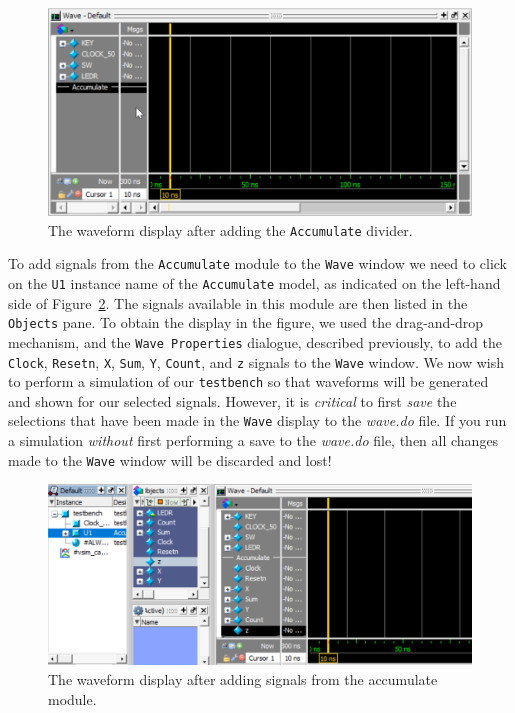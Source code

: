 \documentclass[11pt, twoside, pdftex]{article}
\begin{document}
\newpage
\begin{figure}[h]
	\begin{center}
		\includegraphics[width = \textwidth]{figures/appa_fig7.png}
	\end{center}
	\caption{The waveform display after adding the \texttt{Accumulate} divider.}
	\label{fig:appa_fig7}
\end{figure}

\noindent
To add signals from the \texttt{Accumulate} module to the \texttt{Wave} window we need to
click on the \texttt{U1} instance name of the \texttt{Accumulate} model, as indicated  
on the left-hand side of Figure~\ref{fig:appa_fig8}. The signals available in this module
are then listed in the \texttt{Objects} pane. To obtain the display in the figure, we
used the drag-and-drop mechanism, and the \texttt{Wave Properties} dialogue, described 
previously, to add the \texttt{Clock}, \texttt{Resetn}, \texttt{X}, \texttt{Sum},
\texttt{Y}, \texttt{Count}, and \texttt{z} signals to the \texttt{Wave} window.
We now wish to perform a simulation of our \texttt{testbench} so that waveforms will be 
generated and shown for our selected signals. 
However, it is {\it critical} to first {\it save} the selections
that have been made in the \texttt{Wave} display to the {\it wave.do} file. If you run a 
simulation {\it without} first performing a save to the {\it wave.do} file, then all 
changes made to the \texttt{Wave} window will be discarded and lost!  

\begin{figure}[h!]
	\begin{center}
		\includegraphics[width = \textwidth]{figures/appa_fig8.png}
	\end{center}
		  \caption{The waveform display after adding signals from the accumulate module.}
	\label{fig:appa_fig8}
\end{figure}
\end{document}
